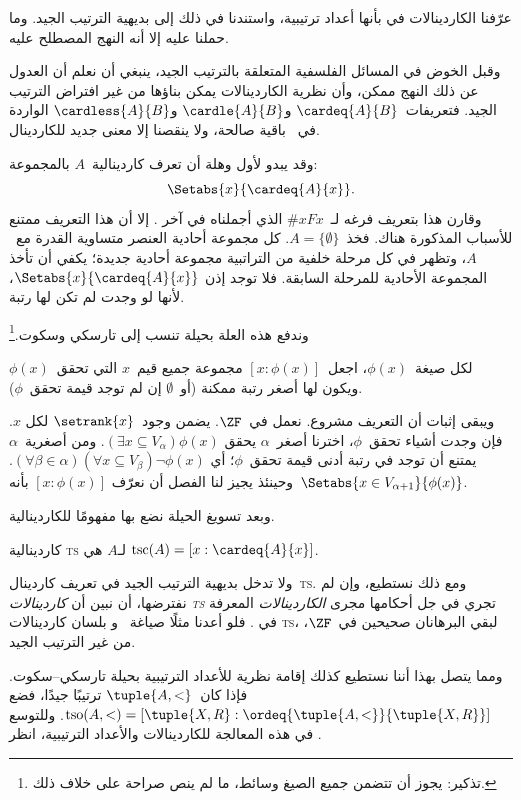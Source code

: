 \documentclass[../../../include/open-logic-section]{subfiles}
\begin{document}

عرّفنا الكاردينالات في
 بأنها أعداد
ترتيبية، واستندنا في ذلك إلى بديهية الترتيب الجيد. وما حملنا عليه إلا
أنه النهج المصطلح عليه.

وقبل الخوض في المسائل الفلسفية المتعلقة بالترتيب الجيد، ينبغي أن نعلم
أن العدول عن ذلك النهج ممكن، وأن نظرية الكاردينالات يمكن بناؤها من غير
افتراض الترتيب الجيد. فتعريفات~$\cardeq{A}{B}$ و$\cardle{A}{B}$
و$\cardless{A}{B}$ الواردة في~ باقية صالحة،
ولا ينقصنا إلا معنى جديد للكاردينال.

وقد يبدو لأول وهلة أن تعرف كاردينالية~$A$ بالمجموعة:
\[
	\Setabs{x}{\cardeq{A}{x}}.
\]
وقارن هذا بتعريف فرغه لـ~$\# x Fx$ الذي أجملناه في آخر
. إلا أن هذا التعريف ممتنع للأسباب المذكورة
هناك. فخذ~$A=\{\emptyset\}$. كل مجموعة أحادية العنصر متساوية القدرة
مع~$A$، وتظهر في كل مرحلة خلفية من التراتبية مجموعة أحادية جديدة؛
يكفي أن تأخذ المجموعة الأحادية للمرحلة السابقة. فلا توجد إذن
$\Setabs{x}{\cardeq{A}{x}}$، لأنها لو وجدت لم تكن لها رتبة.

وندفع هذه العلة بحيلة تنسب إلى تارسكي وسكوت.\footnote{تذكير: يجوز أن
تتضمن جميع الصيغ وسائط، ما لم ينص صراحة على خلاف ذلك.}

\begin{defn}
لكل صيغة~$\phi(x)$، اجعل~$[ x : \phi(x)] $ مجموعة جميع قيم~$x$ التي
تحقق~$\phi(x)$ ويكون لها أصغر رتبة ممكنة (أو~$\emptyset$ إن لم توجد
قيمة تحقق~$\phi$).
\end{defn}

ويبقى إثبات أن التعريف مشروع. نعمل في~$\ZF$. يضمن
 وجود~$\setrank{x}$ لكل
$x$. فإن وجدت أشياء تحقق~$\phi$، اخترنا أصغر~$\alpha$ يحقق
$(\exists x\subseteq V_\alpha)\phi(x)$. ومن أصغرية~$\alpha$ يمتنع أن
توجد في رتبة أدنى قيمة تحقق~$\phi$؛ أي
$(\forall \beta \in \alpha)(\forall x \subseteq V_\beta)
\lnot \phi(x)$. وحينئذ يجيز لنا الفصل أن نعرّف
$[x : \phi(x)]$ بأنه~$\Setabs{x \in V_{\alpha+1}}{\phi(x)}$.

وبعد تسويغ الحيلة نضع بها مفهومًا للكاردينالية.

\begin{defn}
كاردينالية \textsc{ts} لـ$A$ هي
$\text{tsc}(A) = [x : \cardeq{A}{x}]$.
\end{defn}

ولا تدخل بديهية الترتيب الجيد في تعريف كاردينال~\textsc{ts}. ومع ذلك
نستطيع، وإن لم نفترضها، أن نبين أن \emph{كاردينالات \textsc{ts}}
تجري في جل أحكامها مجرى \emph{الكاردينالات} المعرفة في
. فلو أعدنا مثلًا
صياغة~
و بلسان كاردينالات
\textsc{ts}، لبقي البرهانان صحيحين في~$\ZF$، من غير الترتيب الجيد.

ومما يتصل بهذا أننا نستطيع كذلك إقامة نظرية للأعداد الترتيبية بحيلة
تارسكي--سكوت. فإذا كان~$\tuple{A, <}$ ترتيبًا جيدًا، فضع
$\text{tso}(A, <) = [\tuple{X, R} :
\ordeq{\tuple{A, <}}{\tuple{X, R}}]$. وللتوسع في هذه المعالجة
للكاردينالات والأعداد الترتيبية، انظر
\citet[chs.~9--12]{Potter2004}.
\end{document}
